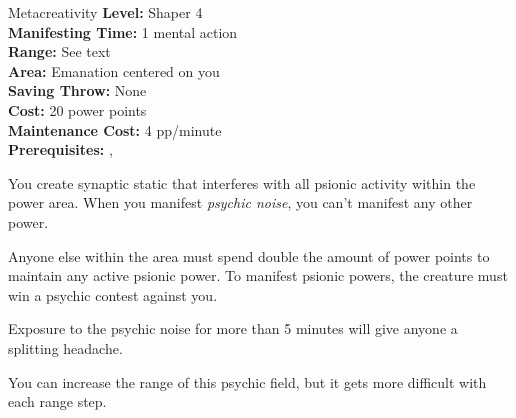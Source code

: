 {Metacreativity}
{
	\textbf{Level:}
	Shaper 4\\
	\textbf{Manifesting Time:}
	1 mental action\\
	\textbf{Range:}
	See text\\
	\textbf{Area:}
	Emanation centered on you\\
	\textbf{Saving Throw:}
	None\\
	\textbf{Cost:}
	20 power points\\
	\textbf{Maintenance Cost:}
	4 pp/minute\\
	\textbf{Prerequisites:}
	, \\
}
{
	You create synaptic static that interferes with all psionic activity within the power area. When you manifest \emph{psychic noise}, you can't manifest any other power.

	Anyone else within the area must spend double the amount of power points to maintain any active psionic power. To manifest psionic powers, the creature must win a psychic contest against you.

	Exposure to the psychic noise for more than 5 minutes will give anyone a splitting headache.
	
	You can increase the range of this psychic field, but it gets more difficult with each range step.

}